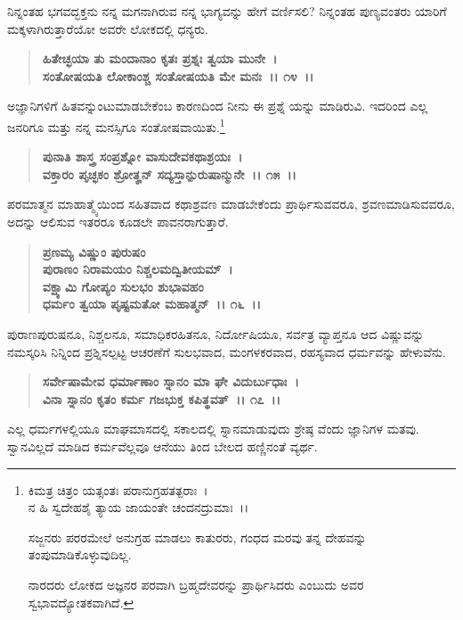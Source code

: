 ನಿನ್ನಂತಹ ಭಗವದ್ಭಕ್ತನು ನನ್ನ ಮಗನಾಗಿರುವ ನನ್ನ ಭಾಗ್ಯವನ್ನು ಹೇಗೆ ವರ್ಣಿಸಲಿ? ನಿನ್ನಂತಹ ಪುಣ್ಯವಂತರು ಯಾರಿಗೆ ಮಕ್ಕಳಾಗಿರುತ್ತಾರೆಯೋ ಅವರೇ ಲೋಕದಲ್ಲಿ ಧನ್ಯರು.

\begin{verse}
\textbf{ಹಿತೇಚ್ಛಯಾ ತು ಮಂದಾನಾಂ ಕೃತಃ ಪ್ರಶ್ನಃ ತ್ವಯಾ ಮುನೇ~।}\\\textbf{ಸಂತೋಷಯತಿ ಲೋಕಾಂಶ್ಚ ಸಂತೋಷಯತಿ ಮೇ ಮನಃ~।। ೧೪~।।}
\end{verse}

ಅಜ್ಞಾನಿಗಳಿಗೆ ಹಿತವನ್ನುಂಟುಮಾಡಬೇಕೆಂಬ ಕಾರಣದಿಂದ ನೀನು ಈ ಪ್ರಶ್ನೆ ಯನ್ನು ಮಾಡಿರುವಿ. ಇದರಿಂದ ಎಲ್ಲ ಜನರಿಗೂ ಮತ್ತು ನನ್ನ ಮನಸ್ಸಿಗೂ ಸಂತೋಷವಾಯಿತು.\footnote{\phantom{*} ಕಿಮತ್ರ ಚಿತ್ರಂ ಯತ್ಸಂತಃ ಪರಾನುಗ್ರಹತತ್ಪರಾಃ~।\\ ನ ಹಿ ಸ್ವದೇಹಶೈ ತ್ಯಾಯ ಜಾಯಂತೇ ಚಂದನದ್ರುಮಾಃ~।।

ಸಜ್ಜನರು ಪರರಮೇಲೆ ಅನುಗ್ರಹ ಮಾಡಲು ಕಾತುರರು, ಗಂಧದ ಮರವು ತನ್ನ ದೇಹವನ್ನು ತಂಪುಮಾಡಿಕೊಳ್ಳುವು\-ದಿಲ್ಲ.

ನಾರದರು ಲೋಕದ ಅಜ್ಞನರ ಪರವಾಗಿ ಬ್ರಹ್ಮದೇವರನ್ನು ಪ್ರಾರ್ಥಿಸಿದರು ಎಂಬುದು ಅವರ ಸ್ವಭಾವದ್ಯೋತಕ\-ವಾಗಿದೆ.}

\begin{verse}
\textbf{ಪುನಾತಿ ಶಾಸ್ತ್ರ ಸಂಪ್ರಶ್ನೋ ವಾಸುದೇವಕಥಾಶ್ರಯಃ~।}\\\textbf{ವಕ್ತಾರಂ ಪೃಚ್ಛಕಂ ಶ್ರೋತೄನ್ ಸದ್ಯಸ್ತಾನ್ಪುರುಷಾನ್ಮುನೇ~।। ೧೫~।।}
\end{verse}

ಪರಮಾತ್ಮನ ಮಾಹಾತ್ಮ್ಯೆಯಿಂದ ಸಹಿತವಾದ ಕಥಾಶ್ರವಣ ಮಾಡಬೇಕೆಂದು ಪ್ರಾರ್ಥಿಸು\-ವವರೂ, ಶ್ರವಣಮಾಡಿಸುವವರೂ, ಅದನ್ನು ಆಲಿಸುವ ಇತರರೂ ಕೂಡಲೇ ಪಾವನ\-ರಾಗುತ್ತಾರೆ.

\begin{verse}
\textbf{ಪ್ರಣಮ್ಯ ವಿಷ್ಣುಂ ಪುರುಷಂ} \\\textbf{ಪುರಾಣಂ ನಿರಾಮಯಂ ನಿಶ್ಚಲಮದ್ವಿತೀಯಮ್~।}\\\textbf{ವಕ್ಷ್ಯಾಮಿ ಗೋಪ್ಯಂ ಸುಲಭಂ ಶುಭಾವಹಂ}\\\textbf{ಧರ್ಮಂ ತ್ವಯಾ ಪೃಷ್ಟಮತೋ ಮಹಾತ್ಮನ್~।। ೧೬~।।}
\end{verse}

ಪುರಾಣಪುರುಷನೂ, ನಿಶ್ಚಲನೂ, ಸಮಾಧಿಕರಹಿತನೂ, ನಿರ್ದೋಷಿಯೂ, ಸರ್ವತ್ರ ವ್ಯಾಪ್ತನೂ ಆದ ವಿಷ್ಣುವನ್ನು ನಮಸ್ಕರಿಸಿ ನಿನ್ನಿಂದ ಪ್ರಶ್ನಿಸಲ್ಪಟ್ಟ ಆಚರಣೆಗೆ ಸುಲಭವಾದ, ಮಂಗಳಕರವಾದ, ರಹಸ್ಯವಾದ ಧರ್ಮವನ್ನು ಹೇಳುವೆನು.

\begin{verse}
\textbf{ಸರ್ವೇಷಾಮೇವ ಧರ್ಮಾಣಾಂ ಸ್ನಾನಂ ಮಾ ಘೇ ವಿದುರ್ಬುಧಾಃ~।}\\\textbf{ವಿನಾ ಸ್ನಾನಂ ಕೃತಂ ಕರ್ಮ ಗಜಭುಕ್ತ ಕಪಿತ್ಥವತ್~।। ೧೭~।।}
\end{verse}

ಎಲ್ಲ ಧರ್ಮಗಳಲ್ಲಿಯೂ ಮಾಘಮಾಸದಲ್ಲಿ ಸಕಾಲದಲ್ಲಿ ಸ್ನಾನಮಾಡುವುದು ಶ್ರೇಷ್ಠ ವೆಂದು ಜ್ಞಾನಿಗಳ ಮತವು. ಸ್ವಾನವಿಲ್ಲದೆ ಮಾಡಿದ ಕರ್ಮವೆಲ್ಲವೂ ಆನೆಯು ತಿಂದ ಬೇಲದ ಹಣ್ಣಿನಂತೆ ವ್ಯರ್ಥ.

